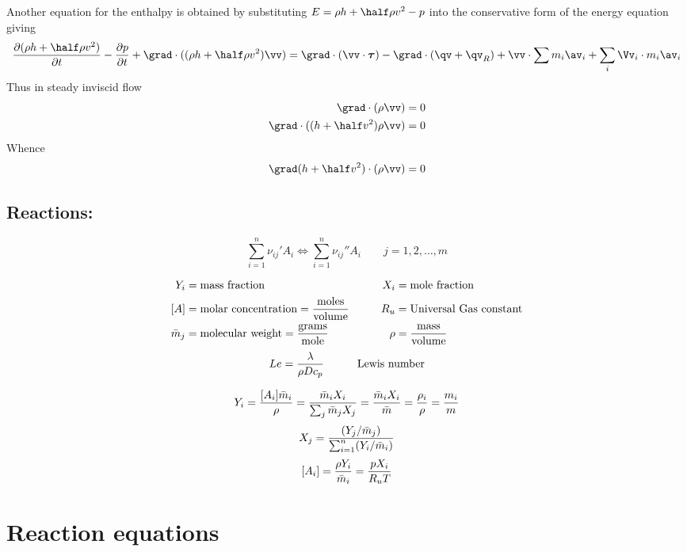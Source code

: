 \documentclass[10pt]{article}
\begin{document}
Another equation for the enthalpy is obtained by substituting $E=\rho h+\half\rho v^2-p$ into the conservative
form of the energy equation giving
\[
    {\partial( \rho h+\half\rho v^2 ) \over \partial t} - {\partial p \over \partial t}
 + \grad\cdot( (\rho h+\half\rho v^2)\vv ) =
              \grad\cdot( \vv\cdot\tauv )
            - \grad\cdot(\qv+\qv_R) + \vv\cdot\sum m_i\av_i + \sum_i \Vv_i\cdot m_i \av_i 
\]
Thus in steady inviscid flow 
\begin{align*}
   \grad\cdot(\rho\vv) &=0 \\
   \grad\cdot( (h+\half v^2)\rho \vv ) &=0
\end{align*}
Whence
\[
   \grad(h+\half v^2)\cdot(\rho\vv) =0
\]

\subsection{Reactions:}
\[
    \sum_{i=1}^n \nu_{ij}' A_i \Leftrightarrow \sum_{i=1}^n \nu_{ij}''A_i  \qquad j=1,2,\ldots,m
\]


\begin{alignat}{3}
   Y_i &= \mbox{mass fraction} &\qquad 
      X_i &= \mbox{mole fraction} \\
        [A] &= \mbox{molar concentration} = {\mbox{moles}\over\mbox{volume}}  &\quad R_u&=\mbox{Universal Gas constant} \\
  \bar{m}_j &= \mbox{molecular weight} = {\mbox{grams}\over\mbox{mole}} &\qquad 
   \rho &= {\mbox{mass}\over\mbox{volume}}
\end{alignat}
\begin{alignat}{2}
   Le &= {\lambda\over \rho D c_p} & \qquad\mbox{Lewis number} 
\end{alignat}


\[
    Y_i = { [A_i] \bar{m}_i \over \rho } = {\bar{m}_i X_i \over \sum_j \bar{m}_j X_j} = {\bar{m}_i X_i \over \bar{m}}
    = { \rho_i \over \rho} = { m_i \over m}
\]
\[
    X_j = { (Y_j /\bar{m}_j) \over \sum_{i=1}^n (Y_i / \bar{m}_i) }
\]
\[
    [A_i] = {\rho Y_i \over \bar{m}_i} = {p X_i \over R_u T}
\]


\section{Reaction equations}
\end{document}
